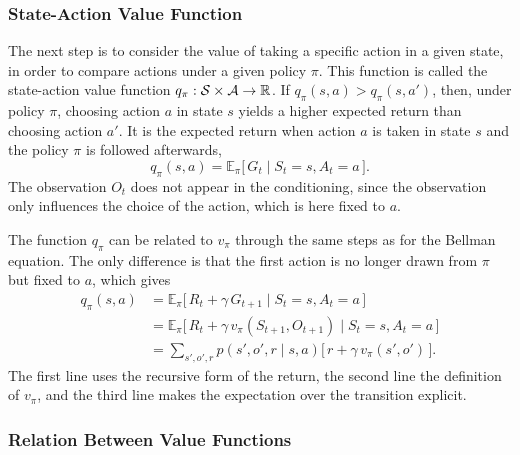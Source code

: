 \subsubsection{State-Action Value Function}
\label{subsubsec:state_action_value_function}

The next step is to consider the value of taking a specific action in a given state, in order to compare actions under a given policy \(\pi\).
This function is called the state-action value function \(q_\pi : \mathcal{S} \times \mathcal{A} \to \mathbb{R}\).
If \(q_\pi(s, a) > q_\pi(s, a')\), then, under policy \(\pi\), choosing action \(a\) in state \(s\) yields a higher expected return than choosing action \(a'\).
It is the expected return when action \(a\) is taken in state \(s\) and the policy \(\pi\) is followed afterwards,
\[
q_\pi(s, a) = \mathbb{E}_\pi\big[\, G_t \mid S_t = s, A_t = a \,\big].
\]
The observation \(O_t\) does not appear in the conditioning, since the observation only influences the choice of the action, which is here fixed to \(a\).

The function \(q_\pi\) can be related to \(v_\pi\) through the same steps as for the Bellman equation.
The only difference is that the first action is no longer drawn from \(\pi\) but fixed to \(a\), which gives
\[
\begin{aligned}
q_\pi(s, a)
&= \mathbb{E}_\pi\big[\, R_t + \gamma \, G_{t+1} \mid S_t = s, A_t = a \,\big] \\[4pt]
&= \mathbb{E}_\pi\big[\, R_t + \gamma \, v_\pi(S_{t+1}, O_{t+1}) \mid S_t = s, A_t = a \,\big] \\[4pt]
&= \sum_{s', o', r} p(s', o', r \mid s, a) \Big[\, r + \gamma \, v_\pi(s', o') \,\Big].
\end{aligned}
\]
The first line uses the recursive form of the return, the second line the definition of \(v_\pi\), and the third line makes the expectation over the transition explicit.

\subsubsection{Relation Between Value Functions}
\label{subsubsec:relation_value_functions}


